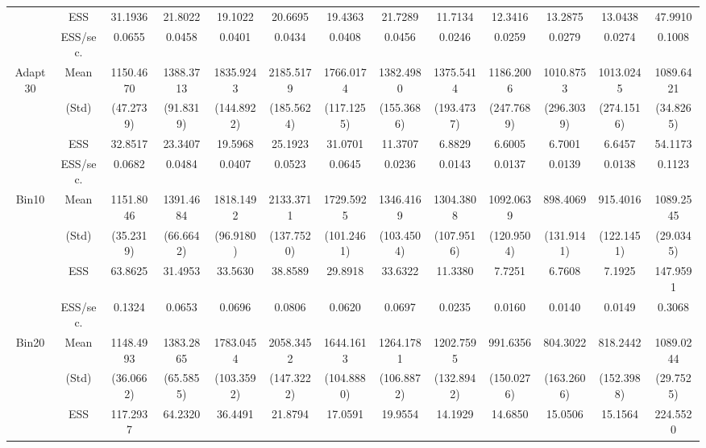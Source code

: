 {{{\begin{table}
{\begin{tabular}{cc ccc ccc ccc cc}
 & ESS 
 & 31.1936  & 21.8022  & 19.1022  & 20.6695  & 19.4363  & 21.7289  & 11.7134  & 12.3416  & 13.2875  & 13.0438  & 47.9910  \\  [0.75ex] 
[476.10 s]  & ESS/sec. 
& 0.0655 & 0.0458 & 0.0401 & 0.0434 & 0.0408 & 0.0456 & 0.0246 & 0.0259 & 0.0279 & 0.0274 & 0.1008  \\  [1.3ex] 
\rowcolor{LightCyan} 
Adapt30 & Mean 
 & 1150.4670  & 1388.3713  & 1835.9243  & 2185.5179  & 1766.0174  & 1382.4980  & 1375.5414  & 1186.2006  & 1010.8753  & 1013.0245  & 1089.6421  \\  [0.75ex] 
 & (Std) 
 & (47.2739)  & (91.8319)  & (144.8922)  & (185.5624)  & (117.1255)  & (155.3686)  & (193.4737)  & (247.7689)  & (296.3039)  & (274.1516)  & (34.8265)  \\  [0.75ex] 
 & ESS 
 & 32.8517  & 23.3407  & 19.5968  & 25.1923  & 31.0701  & 11.3707  & 6.8829  & 6.6005  & 6.7001  & 6.6457  & 54.1173  \\  [0.75ex] 
[481.91 s]  & ESS/sec. 
& 0.0682 & 0.0484 & 0.0407 & 0.0523 & 0.0645 & 0.0236 & 0.0143 & 0.0137 & 0.0139 & 0.0138 & 0.1123  \\  [1.3ex] 
\rowcolor{LightCyan} 
Bin10 & Mean 
 & 1151.8046  & 1391.4684  & 1818.1492  & 2133.3711  & 1729.5925  & 1346.4169  & 1304.3808  & 1092.0639  & 898.4069  & 915.4016  & 1089.2545  \\  [0.75ex] 
 & (Std) 
 & (35.2319)  & (66.6642)  & (96.9180)  & (137.7520)  & (101.2461)  & (103.4504)  & (107.9516)  & (120.9504)  & (131.9141)  & (122.1451)  & (29.0345)  \\  [0.75ex] 
 & ESS 
 & 63.8625  & 31.4953  & 33.5630  & 38.8589  & 29.8918  & 33.6322  & 11.3380  & 7.7251  & 6.7608  & 7.1925  & 147.9591  \\  [0.75ex] 
[482.31 s]  & ESS/sec. 
& 0.1324 & 0.0653 & 0.0696 & 0.0806 & 0.0620 & 0.0697 & 0.0235 & 0.0160 & 0.0140 & 0.0149 & 0.3068  \\  [1.3ex] 
\rowcolor{LightCyan} 
Bin20 & Mean 
 & 1148.4993  & 1383.2865  & 1783.0454  & 2058.3452  & 1644.1613  & 1264.1781  & 1202.7595  & 991.6356  & 804.3022  & 818.2442  & 1089.0244  \\  [0.75ex] 
 & (Std) 
 & (36.0662)  & (65.5855)  & (103.3592)  & (147.3222)  & (104.8880)  & (106.8872)  & (132.8942)  & (150.0276)  & (163.2606)  & (152.3988)  & (29.7525)  \\  [0.75ex] 
 & ESS 
 & 117.2937  & 64.2320  & 36.4491  & 21.8794  & 17.0591  & 19.9554  & 14.1929  & 14.6850  & 15.0506  & 15.1564  & 224.5520  \\  [0.75ex] 

\end{tabular}}
\end{table}}}}
